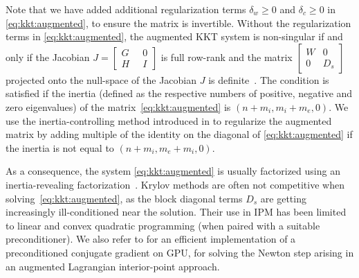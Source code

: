 Note that we have added additional regularization terms $\delta_w \geq 0 $
and $\delta_c \geq 0$ in \eqref{eq:kkt:augmented}, to ensure the
matrix is invertible.
Without the regularization terms in \eqref{eq:kkt:augmented}, the augmented KKT system is non-singular
if and only if the Jacobian $J = \begin{bmatrix} G \; &\; 0 \\ H \;&\; I \end{bmatrix}$
is full row-rank and the matrix $\begin{bmatrix} W  & 0 \\ 0 & D_s \end{bmatrix}$
projected onto the null-space of the Jacobian $J$ is definite~\cite{benzi2005numerical}.
The condition is satisfied if the inertia (defined as the respective numbers
of positive, negative and zero eigenvalues) of the matrix~\eqref{eq:kkt:augmented} is $(n + m_i, m_i + m_e, 0)$.
We use the inertia-controlling method introduced in \cite{wachter2006implementation}
to regularize the augmented matrix by adding multiple of the identity
on the diagonal of \eqref{eq:kkt:augmented} if the inertia is not equal to $(n+m_i, m_e+m_i, 0)$.

As a consequence, the system \eqref{eq:kkt:augmented} is usually factorized using
an inertia-revealing \lblt factorization~\cite{duff1983multifrontal}.
Krylov methods are often not competitive when solving~\eqref{eq:kkt:augmented},
as the block diagonal terms $D_s$ are getting increasingly
ill-conditioned near the solution. Their use in IPM has been limited to
linear and convex quadratic programming \cite{gondzio-2012} (when paired
with a suitable preconditioner). We also refer to \cite{cao2016augmented}
for an efficient implementation of a preconditioned conjugate gradient
on GPU, for solving the Newton step arising in an augmented Lagrangian interior-point
approach.

